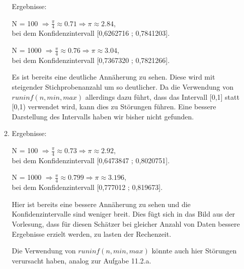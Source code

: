 \documentclass[a4paper]{scrartcl}
\def \blattnr {11}
\begin{document}
\begin{enumerate}[label=\bfseries \blattnr.\arabic*]
\begin{enumerate}
         Ergebnisse:
         
         N = 100 $\Rightarrow \frac\pi4 \approx 0.71 \Rightarrow \pi \approx 2.84$, \\
         bei dem Konfidenzintervall [0,6262716 ; 0,7841203].
         
         N = 1000 $\Rightarrow \frac\pi4 \approx 0.76 \Rightarrow \pi \approx 3.04$, \\
         bei dem Konfidenzintervall [0,7367320 ; 0,7821266].
         
         Es ist bereits eine deutliche Annäherung zu sehen. Diese wird mit steigender 
         Stichprobenanzahl um so deutlicher. Da die Verwendung von $runinf(n,min,max)$ 
         allerdings dazu führt, dass das Intervall [0,1] statt [0,1) verwendet wird,
         kann dies zu Störungen führen. Eine bessere Darstellung des Intervalls haben 
         wir bisher nicht gefunden.
     
     \pagebreak
     \item %
	 
         
         Ergebnisse:
         
         N = 100 $\Rightarrow \frac\pi4 \approx 0.73 \Rightarrow \pi \approx 2.92$, \\
         bei dem Konfidenzintervall [0,6473847 ;  0,8020751].
         
         N = 1000 $\Rightarrow \frac\pi4 \approx 0.799 \Rightarrow \pi \approx 3.196$, \\
         bei dem Konfidenzintervall [0,777012 ; 0,819673].
         
         Hier ist bereits eine bessere Annäherung zu sehen und die Konfidenzintervalle 
         sind weniger breit. Dies fügt sich in das Bild aus der Vorlesung, dass für diesen 
         Schätzer bei gleicher Anzahl von Daten bessere Ergebnisse erzielt werden, zu lasten 
         der Rechenzeit.
         
         Die Verwendung von $runinf(n,min,max)$ könnte auch hier Störungen verursacht haben,
         analog zur Aufgabe 11.2.a.
    \end{enumerate}


\end{enumerate}
\end{document}

